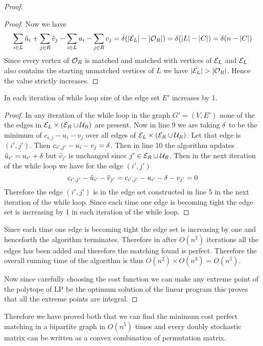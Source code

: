 \begin{proof}
\begin{claimwidth}
\begin{proof}
			Now we have $$
			\sum\limits_{i\in L}\hat{u}_i+\sum\limits_{j\in R}\hat{v}_j-\sum\limits_{i\in L}u_i-\sum\limits_{j\in R}v_j=\delta(|\mathcal{E}_L|-|\mathcal{O}_R|)=\delta(|L|-|C|)=\delta(n-|C|)$$
			Since every vertex of $\mathcal{O}_R$ is matched and matched with vertices of $\mathcal{E}_L$ and $\mathcal{E}_L$ also contains the starting unmatched vertices of $L$ we have $|\mcE_L|>|\mcO_R|$. Hence the value strictly increases.
		\end{proof}
		\begin{claim}{}{}
			In each iteration of while loop size of the edge set $E'$ increases by 1.
		\end{claim}
		\begin{proof}
			In any iteration of the while loop in the graph $G'=(V,E')$ none of the the edges in $\mathcal{E}_L\times (\mathcal{E}_R\cup \mathcal{U}_R)$ are present. Now in line 9 we are taking $\delta$ to be the minimum of $c_{i,j}-u_i-v_j$ over all edges of $\mathcal{E}_L\times (\mathcal{E}_R\cup \mathcal{U}_R)$. Let that edge is $(i',j')$. Then $c_{i',j'}-u_i-v_j=\delta$. Then in line 10 the algorithm updates $\hat{u}_{i'}=u_{i'}+\delta$ but $\hat{v}_{j'}$ is unchanged since $j'\in \mathcal{E}_R\cup\mathcal{U}_R$. Then in the next iteration of the while loop we have for the edge $(i',j')$ $$c_{i',j'}-\hat{u}_{i'}-\hat{v}_{j'}=c_{i',j'}-u_{i'}-\delta-v_{j'}=0$$Therefore the edge $(i',j')$ is in the edge set constructed in line 5 in the next iteration of the while loop. Since each time one edge is becoming tight the edge set is increasing by 1 in each iteration of the while loop.
		\end{proof}
	\end{claimwidth}
	Since each time one edge is becoming tight the edge set is increasing by one and henceforth the algorithm terminates. Therefore in after $O(n^2)$  iterations all the edges has been added and therefore the  matching found is perfect. Therefore the overall running time of the algorithm is thus $O(n^2)\times O(n^3)=O(n^5)$.
	
	Now since carefully choosing the cost function we can make any extreme point of the polytope of LP be the optimum solution of the linear program this proves that all the extreme points are integral.
\end{proof}

Therefore we have proved both that we can find the minimum cost perfect matching in a bipartite graph in $O(n^5)$ times and every doubly stochastic matrix can be written as a convex combination of permutation matrix.


